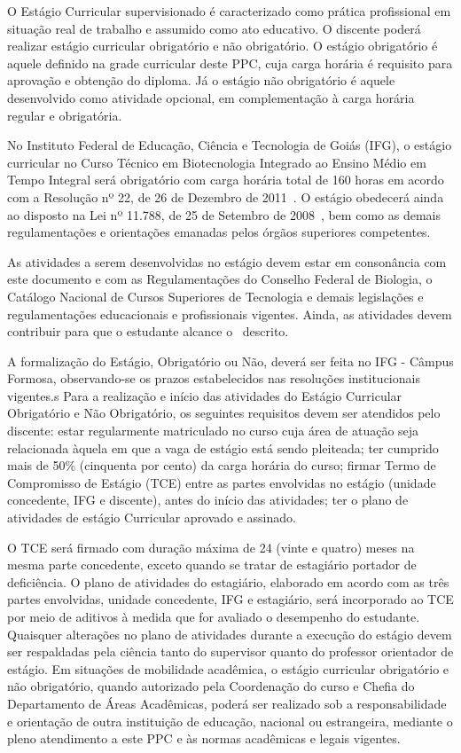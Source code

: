 \documentclass[11pt,fleqn]{book} %
\begin{document}
O Estágio Curricular supervisionado é caracterizado como prática profissional em situação real de trabalho e assumido como ato educativo. 
O discente poderá realizar estágio curricular obrigatório e não obrigatório. 
O estágio obrigatório é aquele definido na grade curricular deste PPC, cuja carga horária é requisito para aprovação e obtenção do diploma. 
Já o estágio não obrigatório é aquele desenvolvido como atividade opcional, em complementação à carga horária regular e obrigatória.

No Instituto Federal de Educação, Ciência e Tecnologia de Goiás (IFG), o estágio curricular no Curso Técnico em Biotecnologia Integrado ao Ensino Médio em Tempo Integral será obrigatório com carga horária total de 160 horas em acordo com a Resolução nº 22, de 26 de Dezembro de 2011~\cite{Resolucao22De2011}.
O estágio obedecerá ainda ao disposto na Lei nº 11.788, de 25 de Setembro de 2008~\cite{Lei11788De2008}, bem como as demais regulamentações e orientações emanadas pelos órgãos superiores competentes. 

As atividades a serem desenvolvidas no estágio devem estar em consonância com este documento e com as Regulamentações do Conselho Federal de Biologia, o Catálogo Nacional de Cursos Superiores de Tecnologia e demais legislações e regulamentações educacionais e profissionais vigentes.
Ainda, as atividades devem contribuir para que o estudante alcance o~ descrito.

A formalização do Estágio, Obrigatório ou Não, deverá ser feita no IFG - Câmpus Formosa, observando-se os prazos estabelecidos nas resoluções institucionais vigentes.s
Para a realização e início das atividades do Estágio Curricular Obrigatório e Não Obrigatório, os seguintes requisitos devem ser atendidos pelo discente: estar regularmente matriculado no curso cuja área de atuação seja relacionada àquela em que a vaga de estágio está sendo pleiteada; ter cumprido mais de 50\% (cinquenta por cento) da carga horária do curso; firmar Termo de Compromisso de Estágio (TCE) entre as partes envolvidas no estágio (unidade concedente, IFG e discente), antes do início das atividades; ter o plano de atividades de estágio Curricular aprovado e assinado.

O TCE será firmado com duração máxima de 24 (vinte e quatro) meses na mesma parte concedente, exceto quando se tratar de estagiário portador de deficiência. 
O plano de atividades do estagiário, elaborado em acordo com as três partes envolvidas, unidade concedente, IFG e estagiário, será incorporado ao TCE por meio de aditivos à medida que for avaliado o desempenho do estudante. 
Quaisquer alterações no plano de atividades durante a execução do estágio devem ser respaldadas pela ciência tanto do supervisor quanto do professor orientador de estágio.
Em situações de mobilidade acadêmica, o estágio curricular obrigatório e não obrigatório, quando autorizado pela Coordenação do curso e Chefia do Departamento de Áreas Acadêmicas, poderá ser realizado sob a responsabilidade e orientação de outra instituição de educação, nacional ou estrangeira, mediante o pleno atendimento a este PPC e às normas acadêmicas e legais vigentes.
\end{document}
